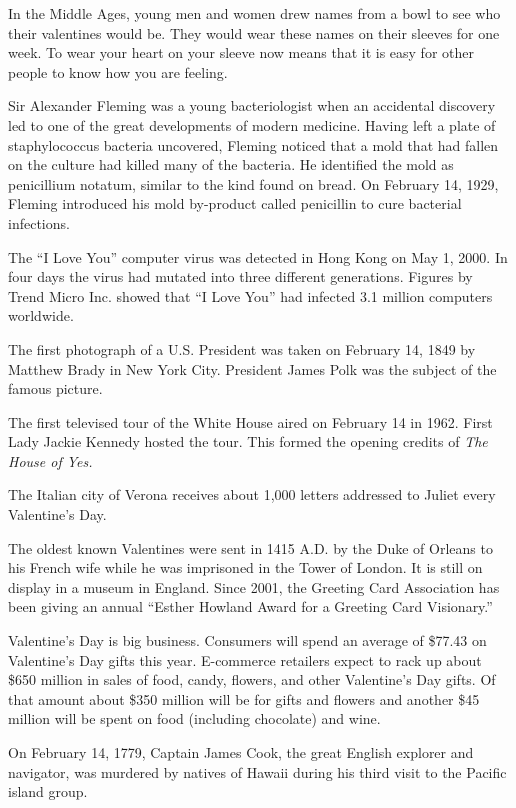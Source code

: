 \documentclass[12pt]{article}
\begin{document}
In the Middle Ages, young men and women drew names from a bowl to see who their valentines would be. They would wear these names on their sleeves for one week. To wear your heart on your sleeve now means that it is easy for other people to know how you are feeling.

Sir Alexander Fleming was a young bacteriologist when an accidental discovery led to one of the great developments of modern medicine. Having left a plate of staphylococcus bacteria uncovered, Fleming noticed that a mold that had fallen on the culture had killed many of the bacteria. He identified the mold as penicillium notatum, similar to the kind found on bread. On February 14, 1929, Fleming introduced his mold by-product called penicillin to cure bacterial infections.

\pagebreak

The ``I Love You'' computer virus was detected in Hong Kong on May 1, 2000. In four days the virus had mutated into three different generations. Figures by Trend Micro Inc. showed that ``I Love You'' had infected 3.1 million computers worldwide.

The first photograph of a U.S. President was taken on February 14, 1849 by Matthew Brady in New York City. President James Polk was the subject of the famous picture.

The first televised tour of the White House aired on February 14 in 1962. First Lady Jackie Kennedy hosted the tour.  This formed the opening credits of {\it The House of Yes.}

The Italian city of Verona receives about 1,000 letters addressed to Juliet every Valentine's Day.

The oldest known Valentines were sent in 1415 A.D. by the Duke of Orleans to his French wife while he was imprisoned in the Tower of London. It is still on display in a museum in England.  Since 2001, the Greeting Card Association has been giving an annual ``Esther Howland Award for a Greeting Card Visionary.''

Valentine's Day is big business. Consumers will spend an average of \$77.43 on Valentine's Day gifts this year. E-commerce retailers expect to rack up about \$650 million in sales of food, candy, flowers, and other Valentine's Day gifts. Of that amount about \$350 million will be for gifts and flowers and another \$45 million will be spent on food (including chocolate) and wine.

On February 14, 1779, Captain James Cook, the great English explorer and navigator, was murdered by natives of Hawaii during his third visit to the Pacific island group.
\end{document}
